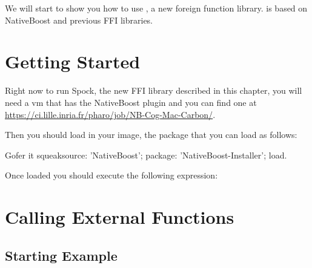 \documentclass[a4paper,10pt,twoside]{book}
\begin{document}
We will start to show you how to use \Spock, a new foreign function library. \Spock is based on NativeBoost and previous FFI libraries.


\section{Getting Started}



Right now to run Spock, the new FFI library described in this chapter, you will need a vm that has the NativeBoost plugin and  you can find one at \url{https://ci.lille.inria.fr/pharo/job/NB-Cog-Mac-Carbon/}.  

Then you should load in your image, the package  that you can load as follows:
\begin{code}{}
Gofer it
        squeaksource: 'NativeBoost';
        package: 'NativeBoost-Installer';
        load.
\end{code}

Once loaded you should execute the following expression: 


%
%
%
%
%
%
%
% 
%


\section{Calling External Functions}


\subsection{Starting Example}
\end{document}
